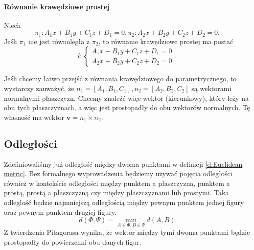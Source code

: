 \paragraph{Równanie krawędziowe prostej} Niech
\[ \pi_1 : A_1x + B_1y + C_1z + D_1 = 0, \pi_2 : A_2x + B_2y + C_2z + D_2 = 0. \]
Jeśli $\pi_1$ nie jest równoległa z $\pi_2$, to równanie krawędziowe prostej ma postać
\begin{equation}
    l : \begin{cases}
        A_1x + B_1y + C_1z + D_1 = 0 \\
        A_2x + B_2y + C_2z + D_2 = 0
    \end{cases}.
\end{equation}

\begin{remark*}
    Jeśli chcemy łatwo przejść z równania krawędziowego do parametrycznego, to wystarczy zauważyć, że $n_1 = [A_1, B_1, C_1], n_2 = [A_2, B_2, C_2]$ są wektorami normalnymi płaszczyzn. Chcemy znaleźć więc wektor (kierunkowy), który leży na obu tych płaszczyznach, a więc jest prostopadły do obu wektorów normalnych. Tę własność ma wektor $\symbf{v} = n_1 \times n_2$.
\end{remark*}

\subsection{Odległości}
Zdefiniowaliśmy już odległość między dwoma punktami w definicji \ref{d:Euclidean metric}. Bez formalnego wyprowadzenia będziemy używać pojęcia odległości również w kontekście odległości między punktem a płaszczyzną, punktem a prostą, prostą a płaszczyzną czy między płaszczyznami lub prostymi. Taka odległość będzie najmniejszą odległością między pewnym punktem jednej figury oraz pewnym punktem drugiej figury.
\[ d(\Phi, \Psi) = \min_{A \in \Phi, B \in \Psi} d(A, B) \]
Z twierdzenia Pitagorasa wynika, że wektor między tymi dwoma punktami będzie prostopadły do powierzchni obu danych figur.

